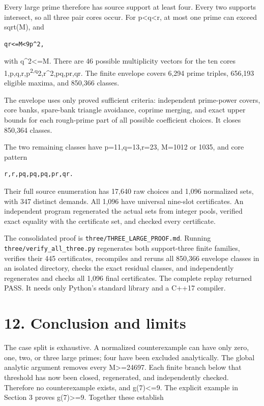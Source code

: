 \documentclass[11pt,a4paper]{article}
\begin{document}
Every large prime therefore has source support at least four. Every two
supports intersect, so all three pair cores occur. For
p\textless q\textless r, at most one prime can exceed sqrt(M), and

\begin{verbatim}
qr<=M<9p^2,
\end{verbatim}

with q\^{}2\textless=M. There are 46 possible multiplicity vectors for
the ten cores 1,p,q,r,p\textsuperscript{2,q}2,r\^{}2,pq,pr,qr. The
finite envelope covers 6,294 prime triples, 656,193 eligible maxima, and
850,366 classes.

The envelope uses only proved sufficient criteria: independent
prime-power covers, core banks, spare-bank triangle avoidance, coprime
merging, and exact upper bounds for each rough-prime part of all
possible coefficient choices. It closes 850,364 classes.

The two remaining classes have p=11,q=13,r=23, M=1012 or 1035, and core
pattern

\begin{verbatim}
r,r,pq,pq,pq,pr,qr.
\end{verbatim}

Their full source enumeration has 17,640 raw choices and 1,096
normalized sets, with 347 distinct demands. All 1,096 have universal
nine-slot certificates. An independent program regenerated the actual
sets from integer pools, verified exact equality with the certificate
set, and checked every certificate.

The consolidated proof is \nolinkurl{three/THREE_LARGE_PROOF.md}. Running
\nolinkurl{three/verify_all_three.py} regenerates both support-three
finite families, verifies their 445 certificates, recompiles and reruns
all 850,366 envelope classes in an isolated directory, checks the exact
residual classes, and independently regenerates and checks all 1,096
final certificates. The complete replay returned PASS. It needs only
Python's standard library and a C++17 compiler.

\section{12. Conclusion and limits}\label{conclusion-and-limits}

The case split is exhaustive. A normalized counterexample can have only
zero, one, two, or three large primes; four have been excluded
analytically. The global analytic argument removes every
M\textgreater=24697. Each finite branch below that threshold has now
been closed, regenerated, and independently checked. Therefore no
counterexample exists, and g(7)\textless=9. The explicit example in
Section 3 proves g(7)\textgreater=9. Together these establish
\end{document}
